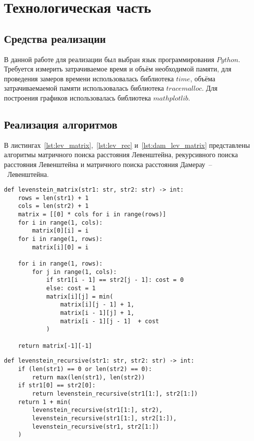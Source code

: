 \chapter{Технологическая часть}

\section{Средства реализации}

В данной работе для реализации был выбран язык программирования $Python$. Требуется измерить затрачиваемое время и объём необходимой памяти, для проведения замеров времени использовалась библиотека $time$, объёма затрачиваемаемой памяти использовалась библиотека $tracemalloc$. Для построения графиков использовалась библиотека $mathplotlib$.

\section{Реализация алгоритмов}

В листингах~\ref{lst:lev_matrix},~\ref{lst:lev_rec} и~\ref{lst:dam_lev_matrix} представлены алгоритмы матричного поиска расстояния Левенштейна, рекурсивного поиска расстояния Левенштейна и матричного поиска расстояния Дамерау~--~Левенштейна.
\begin{center}
    \captionsetup{justification=raggedright,singlelinecheck=off}
    \begin{lstlisting}[label=lst:lev_matrix,caption=Матричный алгоритм поиска расстояния Левенштейна]
def levenstein_matrix(str1: str, str2: str) -> int:
	rows = len(str1) + 1
	cols = len(str2) + 1
	matrix = [[0] * cols for i in range(rows)]
	for i in range(1, cols):
		matrix[0][i] = i
	for i in range(1, rows):
		matrix[i][0] = i

	for i in range(1, rows):
		for j in range(1, cols):
			if str1[i - 1] == str2[j - 1]: cost = 0
			else: cost = 1
			matrix[i][j] = min(
				matrix[i][j - 1] + 1, 
				matrix[i - 1][j] + 1, 
				matrix[i - 1][j - 1]  + cost
			)

	return matrix[-1][-1]
\end{lstlisting}
\end{center}

\begin{center}
    \captionsetup{justification=raggedright,singlelinecheck=off}
    \begin{lstlisting}[label=lst:lev_rec,caption=Рекурсивный алгоритм поиска расстояния Левенштейна]
def levenstein_recursive(str1: str, str2: str) -> int:
	if (len(str1) == 0 or len(str2) == 0):
		return max(len(str1), len(str2))
	if str1[0] == str2[0]:
		return levenstein_recursive(str1[1:], str2[1:])
	return 1 + min(
		levenstein_recursive(str1[1:], str2),
		levenstein_recursive(str1[1:], str2[1:]),
		levenstein_recursive(str1, str2[1:])
	)
\end{lstlisting}
\end{center}

